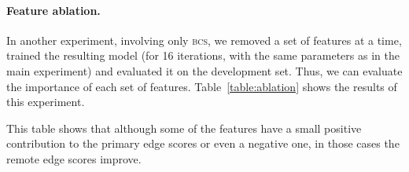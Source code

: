 \documentclass[11pt]{article}
\newcommand{\secref}[1]{Section~\ref{#1}}
\newcommand{\figref}[1]{Figure~\ref{#1}}
\newcommand{\tabref}[1]{Table~\ref{#1}}
\begin{document}
\paragraph{Feature ablation.}

In another experiment, involving only \textsc{bcs}, we removed a set of features at a time, trained the resulting model (for 16 iterations, with the same parameters as in the main experiment) and evaluated it on the development set. Thus, we can evaluate the importance of each set of features. \tabref{table:ablation} shows the results of this experiment.


\begin{table}[ht]
\caption{\small
  Results in percents of the feature ablation experiment.
  See \figref{fig:features} for the definition of each feature set; \textbf{disco} refers to all discontiguous features, and \textbf{ratio} is the number of terminals divided by the total number of nodes (\secref{subsec:features}).
}
\label{table:ablation}
\end{table}

This table shows that although some of the features have a small positive contribution to the primary edge scores or even a negative one, in those cases the remote edge scores improve.
\end{document}
